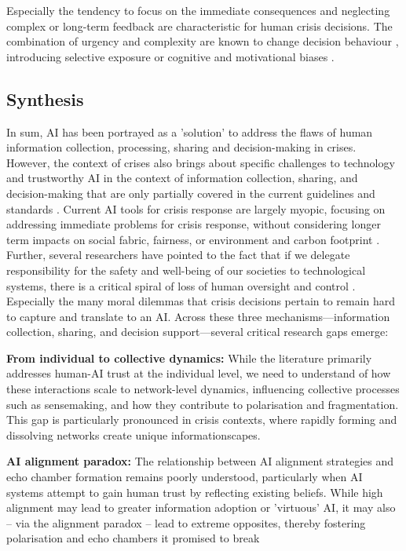 \documentclass[pdflatex,sn-apa]{sn-jnl}%
\begin{document}
Especially the tendency to focus on the immediate consequences and neglecting complex or long-term feedback \citep{comes2020coordination} are characteristic for human crisis decisions. The combination of urgency and complexity are known to change decision behaviour \citep{klein2010rapid}, introducing selective exposure \citep{barbera2015tweeting} or cognitive and motivational biases \citep{paulus2024interplay}. 

\subsection{Synthesis}
In sum, AI has been portrayed as a 'solution' to address the flaws of human information collection, processing, sharing and decision-making in crises. However, the context of crises also brings about specific challenges to technology and trustworthy AI in the context of information collection, sharing, and decision-making that are only partially covered in the current guidelines and standards \citep{ozmen2023six}. Current AI tools for crisis response are largely myopic, focusing on addressing immediate problems for crisis response, without considering longer term impacts on social fabric, fairness, or environment and carbon footprint \citep{harika2024harnessing}. Further, several researchers have pointed to the fact that if we delegate responsibility for the safety and well-being of our societies to technological systems, there is a critical spiral of loss of human oversight and control \citep{comes2024ai}. Especially the many moral dilemmas that crisis decisions pertain to remain hard to capture and translate to an AI. Across these three mechanisms—information collection, sharing, and decision support—several critical research gaps emerge:

\textbf{From individual to collective dynamics: }While the literature primarily addresses human-AI trust at the individual level, we need to understand of how these interactions scale to network-level dynamics, influencing collective processes such as sensemaking, and how they contribute to polarisation and fragmentation. This gap is particularly pronounced in crisis contexts, where rapidly forming and dissolving networks create unique informationscapes.

\textbf{AI alignment paradox:} The relationship between AI alignment strategies and echo chamber formation remains poorly understood, particularly when AI systems attempt to gain human trust by reflecting existing beliefs. While high alignment may lead to greater information adoption or 'virtuous' AI, it may also -- via the alignment paradox \citep{west2025ai} -- lead to extreme opposites, thereby fostering polarisation and echo chambers it promised to break
 
\end{document}
